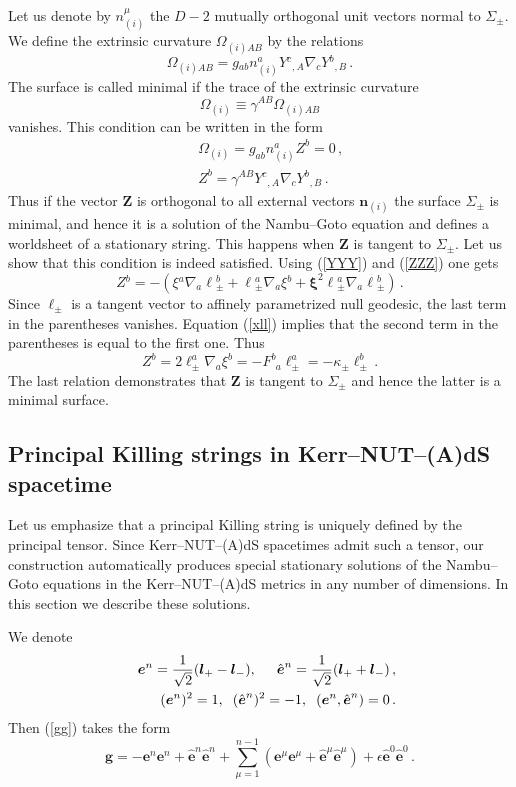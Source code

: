 \documentclass[superscriptaddress,twocolumn,showpacs,
preprintnumbers,amsmath,amssymb,nofootinbib,
longbibliography,aps,prd,10pt]{revtex4-1}
\newcommand{\hh}{,\hspace{0.5cm}}
\newcommand{\hhh}{,\hspace{0.2cm}}
\newcommand{\ts}[1]{{\boldsymbol{#1}}}         %
\newcommand{\be}{\begin{equation}}             %
\newcommand{\ee}{\end{equation}}               %
\newcommand{\ba}{\begin{eqnarray}}             %
\newcommand{\ea}{\end{eqnarray}}               %
\newcommand{\n}[1]{\label{#1}}
\begin{document}
Let us denote by $n{}^\mu_{(i)}$ the $D-2$ mutually orthogonal unit vectors  normal to $\Sigma_{\pm}$.
We define the extrinsic curvature $\Omega{}_{(i)AB}$ by the relations
\be
\Omega{}_{(i)AB}= g{}_{ab} n{}_{(i)}^a Y{}^c{}_{,A} \nabla{}_c Y{}^b{}_{,B} \, .
\ee
The surface is called minimal if the trace of the extrinsic curvature
\be
\Omega{}_{(i)} \equiv \gamma{}^{AB}\Omega{}_{(i)AB}
\ee
vanishes. This condition can be written in the form
\ba
&&\Omega{}_{(i)}=g_{ab} n_{(i)}^a Z^b=0\, ,\\
&&Z^b=\gamma{}^{AB} Y{}^c{}_{,A} \nabla{}_c Y{}^b{}_{,B}\, .\n{ZZZ}
\ea
Thus if the vector $\ts{Z}$ is orthogonal to all external vectors $\ts{n}_{(i)}$ the surface $\Sigma_{\pm}$  is minimal, and hence it is a solution of the Nambu--Goto equation and defines a worldsheet of a stationary string. This happens when $\ts{Z}$ is tangent to $\Sigma_{\pm}$. Let us show that this condition is indeed satisfied.
Using (\ref{YYY}) and (\ref{ZZZ}) one gets
\be
Z{}^b = -\left( \xi{}^a\nabla{}_a \ell{}_{\pm}^b + \ell{}_{\pm}^a \nabla{}_a \xi{}^b + \ts{\xi}^2\ell{}_{\pm}^a \nabla{}_a \ell{}_{\pm}^b\right)\, .
\ee
Since $\ts{\ell}_{\pm}$ is a tangent vector to affinely parametrized null geodesic, the last term in the parentheses vanishes. Equation (\ref{xll}) implies that the second term in the parentheses is equal to the first one. Thus
\be
Z^b=2\ell_{\pm}^a \nabla_a \xi^b=-F^b_{\ \ a}\ell_{\pm}^a=-\kappa_{\pm}\ell_{\pm}^b\, .
\ee
The last relation demonstrates that $\ts{Z}$ is tangent to $\Sigma_{\pm}$ and hence the latter is a minimal surface.

\subsection{Principal Killing strings in Kerr--NUT--(A)dS spacetime}
\label{sec:off-shell}

Let us emphasize that a principal Killing string is uniquely defined by the principal tensor. Since Kerr--NUT--(A)dS spacetimes admit such a tensor, our construction automatically produces special stationary solutions of the Nambu--Goto equations in the Kerr--NUT--(A)dS metrics in any number of dimensions. In this section we describe these solutions.

We denote
\ba
&&\ts{e}^n={1\over \sqrt{2}}(\ts{l}_+ -\ts{l}_-)\hh
\hat{\ts{e}}^n={1\over \sqrt{2}}(\ts{l}_+ +\ts{l}_-)\, ,\\
&& (\ts{e}^n)^2=1\hhh (\hat{\ts{e}}^n)^2=-1\hhh (\ts{e}^n,\hat{\ts{e}}^n)=0\, .
\ea
Then (\ref{gg}) takes the form
\be\n{mee}
\ts{g}=-\ts{e}^{n}\ts{e}^{n}+ \hat{\ts{e}}^{n}\hat{\ts{e}}^{n} +\sum\limits_{\mu=1}^{n-1} (\ts{e}^{\mu}\ts{e}^{\mu}+ \hat{\ts{e}}^{\mu}\hat{\ts{e}}^{\mu})+\epsilon \hat{\ts{e}}^{0}\hat{\ts{e}}^{0}\, .
\ee
\end{document}
